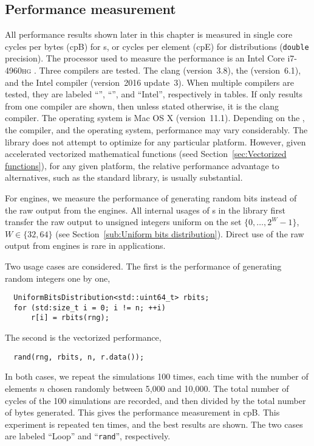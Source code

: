 \subsection{Performance measurement}
\label{sub:Performance measurement}

All performance results shown later in this chapter is measured in single core
cycles per bytes (cpB) for \rng{}s, or cycles per element (cpE) for
distributions (\verb|double| precision). The processor used to measure the
performance is an Intel Core i7-4960\textsc{hg} \cpu. Three compilers are
tested. The \llvm clang (version~3.8), the \gnu{} \gcc (version~6.1), and the
Intel \cpp compiler (version~2016 update~3). When multiple compilers are
tested, they are labeled ``\llvm'', ``\gnu'', and ``Intel'', respectively in
tables. If only results from one compiler are shown, then unless stated
otherwise, it is the \llvm clang compiler. The operating system is Mac OS X
(version~11.1). Depending on the \cpu, the compiler, and the operating system,
performance may vary considerably. The library does not attempt to optimize for
any particular platform. However, given accelerated vectorized mathematical
functions (seed Section~\ref{sec:Vectorized functions}), for any given
platform, the relative performance advantage to alternatives, such as the
standard library, is usually substantial.

For \rng engines, we measure the performance of generating random bits instead
of the raw output from the engines. All internal usages of \rng{}s in the
library first transfer the raw output to unsigned integers uniform on the set
$\{0,\dots,2^W-1\}$, $W\in\{32,64\}$ (see Section~\ref{sub:Uniform bits
  distribution}). Direct use of the raw output from \rng engines is rare in
applications.

Two usage cases are considered. The first is the performance of generating
random integers one by one,
\begin{Verbatim}
  UniformBitsDistribution<std::uint64_t> rbits;
  for (std:size_t i = 0; i != n; ++i)
      r[i] = rbits(rng);
\end{Verbatim}
The second is the vectorized performance,
\begin{Verbatim}
  rand(rng, rbits, n, r.data());
\end{Verbatim}
In both cases, we repeat the simulations 100 times, each time with the number
of elements $n$ chosen randomly between 5,000 and 10,000. The total number of
cycles of the 100 simulations are recorded, and then divided by the total
number of bytes generated. This gives the performance measurement in cpB. This
experiment is repeated ten times, and the best results are shown. The two cases
are labeled ``Loop'' and ``\verb|rand|'', respectively.

